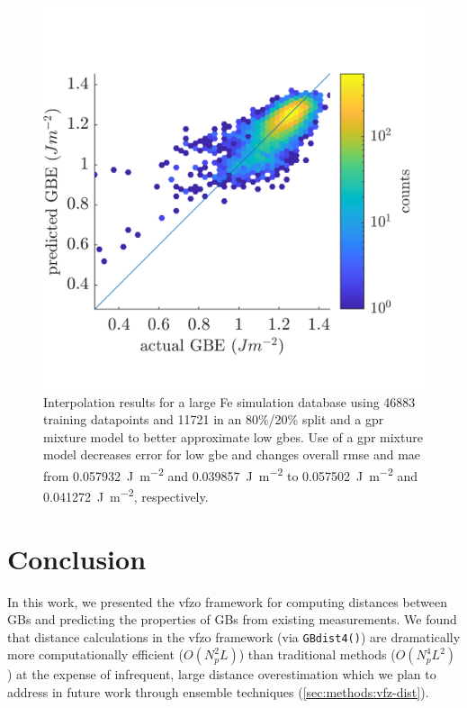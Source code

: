 \documentclass[final,twocolumn,12pt]{elsarticle}
\newcommand{\distfn}{GBdist4}
\begin{document}
\begin{figure}
    \centering
    \includegraphics{kim-interp.png}
    \caption{Interpolation results for a large Fe simulation database \cite{kimPhasefieldModeling3D2014} using \num{46883} training datapoints and \num{11721} in an 80\%/20\% split and a \gls{gpr} mixture model to better approximate low \glspl{gbe}. Use of a \gls{gpr} mixture model decreases error for low \gls{gbe} and changes overall \gls{rmse} and \gls{mae} from \SI{0.057932}{\J\per\square\meter} and \SI{0.039857}{\J\per\square\meter} to \SI{0.057502}{\J\per\square\meter} and \SI{0.041272}{\J\per\square\meter}, respectively.}
    \label{fig:kim-interp}
\end{figure}


\section{Conclusion} \label{sec:conclusion}

In this work, we presented the \gls{vfzo} framework for computing distances between GBs and predicting the properties of GBs from existing measurements. We found that distance calculations in the \gls{vfzo} framework (via \texttt{\distfn{}()}) are dramatically more computationally efficient ($O(N_p^2L)$) than traditional methods ($O(N_p^4L^2)$) at the expense of infrequent, large distance overestimation which we plan to address in future work through ensemble techniques (\cref{sec:methods:vfz-dist}).
\end{document}
